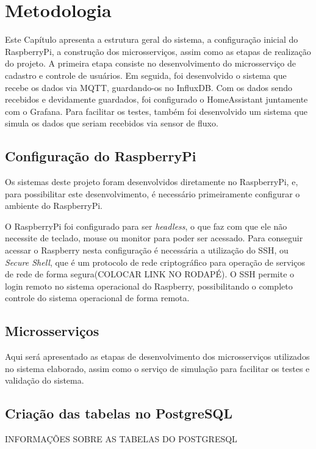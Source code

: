 \chapter{Metodologia}

Este Capítulo apresenta a estrutura geral do sistema, a configuração inicial do RaspberryPi, a construção dos microsserviços, assim como as etapas de realização do projeto. A
primeira etapa consiste no desenvolvimento do microsserviço de cadastro e controle de usuários. Em seguida, foi desenvolvido o sistema que recebe os dados via MQTT, guardando-os no InfluxDB. Com os dados sendo recebidos e devidamente guardados, foi configurado o HomeAssistant juntamente com o Grafana. Para facilitar os testes, também foi desenvolvido um sistema que simula os dados que seriam recebidos via sensor de fluxo.

\section{Configuração do RaspberryPi}

Os sistemas deste projeto foram desenvolvidos diretamente no RaspberryPi, e, para possibilitar este desenvolvimento, é necessário primeiramente configurar o ambiente do RaspberryPi.

O RaspberryPi foi configurado para ser \textit{headless}, o que faz com que ele não necessite de teclado, mouse ou monitor para poder ser acessado. Para conseguir acessar o Raspberry nesta configuração é necessária a utilização do SSH, ou \textit{Secure Shell}, que é um protocolo de rede criptográfico para operação de serviços de rede de forma segura(COLOCAR LINK NO RODAPÉ). O SSH permite o login remoto no sistema operacional do Raspberry, possibilitando o completo controle do sistema operacional de forma remota.

\section{Microsserviços}

Aqui será apresentado as etapas de desenvolvimento dos microsserviços utilizados no sistema elaborado, assim como o serviço de simulação para facilitar os testes e validação do sistema.

\section{Criação das tabelas no PostgreSQL}

INFORMAÇÕES SOBRE AS TABELAS DO POSTGRESQL

